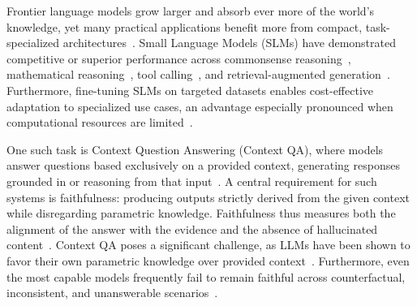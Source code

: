 Frontier language models grow larger and absorb ever more of the world's knowledge, yet many practical applications benefit more from compact, task-specialized architectures~\citep{belcak2025small}. Small Language Models (SLMs) have demonstrated competitive or superior performance across commonsense reasoning~\citep{cao2026taskspecificefficiencyanalysissmall}, mathematical reasoning~\citep{liu2023tinygsm}, tool calling~\citep{zhang2025xlam}, and retrieval-augmented generation~\citep{schick-schutze-2021-just}. Furthermore, fine-tuning SLMs on targeted datasets enables cost-effective adaptation to specialized use cases, an advantage especially pronounced when computational resources are limited~\citep{gururangan-etal-2020-dont}.

One such task is Context Question Answering (Context QA), where models answer questions based exclusively on a provided context, generating responses grounded in or reasoning from that input~\citep{DBLP:conf/acl/RadevskiGSMNHSH25,aushev-etal-2025-ragulator}. A central requirement for such systems is faithfulness: producing outputs strictly derived from the given context while disregarding parametric knowledge. Faithfulness thus measures both the alignment of the answer with the evidence and the absence of hallucinated content~\citep{pletenev-etal-2025-will,rurage,psiloqa}. Context QA poses a significant challenge, as LLMs have been shown to favor their own parametric knowledge over provided context~\citep{sun2026taskmattersknowledgerequirements}. Furthermore, even the most capable models frequently fail to remain faithful across counterfactual, inconsistent, and unanswerable scenarios~\citep{ming2025faitheval,bi-etal-2025-context}.

